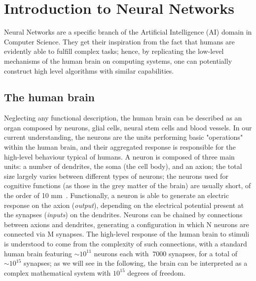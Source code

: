 \section{Introduction to Neural Networks}
Neural Networks are a specific branch of the Artificial Intelligence (AI) domain in Computer Science.
They get their inspiration from the fact that humans are evidently able to fulfill complex tasks; hence, by replicating the low-level mechanisms of the human brain on computing systems, one can potentially construct high level algorithms with similar capabilities.

\subsection{The human brain}
\label{subsect:brain}
Neglecting any functional description, the human brain can be described as an organ composed by neurons, glial cells, neural stem cells and blood vessels. %
 In our current understanding, the neurons are the units performing basic "operations" within the human brain, and their aggregated response is responsible for the high-level behaviour typical of humans.
 A neuron 
 is composed of three main units: a number of dendrites, the soma (the cell body), and an axion; the total size largely varies between different types of neurons; the neurons used for cognitive functions (as those in the grey matter of the brain) are usually short, of the order of 10 mm~\cite{neuronlength}.
Functionally, a neuron is able to generate an electric response on the axion (\emph{output}), depending on the electrical potential present at the synapses (\emph{inputs}) on the dendrites. Neurons can be chained by connections between axions and dendrites, generating a configuration in which N neurons are connected via M synapses.
 The high-level response of the human brain to stimuli is understood to come from the complexity of such connections, with a standard human brain featuring $\sim 10^{11}$ neurons each with $~7000$ synapses, for a total of $\sim 10^{15}$ synapses; as we will see in the following, the brain can be interpreted as a complex mathematical system with $10^{15}$ degrees of freedom.

